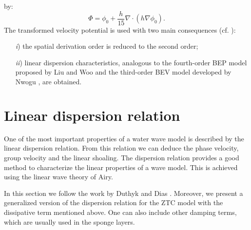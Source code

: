 by:
\begin{equation}\label{eq::phitrans}
\Phi=\phi_0+\frac{h}{15}\nabla\cdot(h\nabla\phi_0) .
\end{equation}
 The transformed velocity potential
is used with two main consequences  (cf. \cite{ZhaTen04}):
\begin{itemize}
\item[{\it i})]  the  spatial derivation order is reduced to the
second order;
\item[{\it ii})] linear dispersion characteristics,
analogous to the fourth-order BEP model proposed by Liu and Woo 
 \cite{LiuWoo04} and  the third-order BEV model  developed
by  Nwogu  \cite{Nwo93}, are obtained.       
\end{itemize}



\section{Linear dispersion relation}
One of the most important properties of a water  wave model is
described by the linear dispersion relation.
From this relation we can deduce the phase velocity, group velocity
and the linear shoaling.   
The dispersion relation provides
a good method to characterize the linear
properties of a wave model. 
This is achieved using the linear wave
theory of Airy.
  
In this section we follow the  work by Duthyk and
Dias \cite{DutDia07}. 
Moreover, we  present a generalized version of the dispersion
relation for the ZTC model with the
dissipative term mentioned above.
One can also include other damping terms, which are usually
used in the sponge layers.

